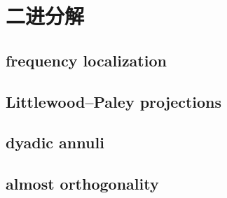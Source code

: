 \section{二进分解}
\label{b2:sec:1903}


\subsection{frequency localization}
\label{b2:subsec:190301}

\subsection{Littlewood–Paley projections}
\label{b2:subsec:190302}

\subsection{dyadic annuli}
\label{b2:subsec:190303}

\subsection{almost orthogonality}
\label{b2:subsec:190304}


